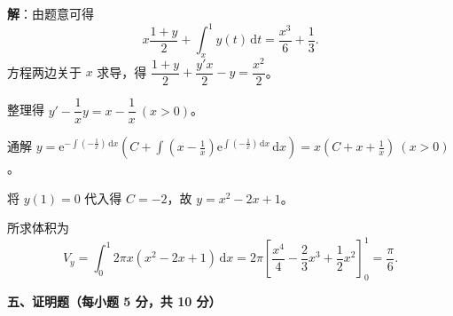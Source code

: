\documentclass[a4paper,11pt]{ctexart}
\newcommand{\dd}{\,\mathrm{d}}
\newcommand{\e}{\mathrm{e}}
\begin{document}
\begin{enumerate}[label=\arabic*., start=17, leftmargin=2em, itemsep=0.9em, topsep=0.45em]
  \textbf{解}：由题意可得
  \[
    x\frac{1+y}{2}+\int_x^1 y(t)\dd t=\frac{x^3}{6}+\frac{1}{3}.
  \]
  方程两边关于 $x$ 求导，得 $\dfrac{1+y}{2}+\dfrac{y'x}{2}-y=\dfrac{x^2}{2}$。

  整理得 $y'-\dfrac{1}{x}y=x-\dfrac{1}{x}\ (x>0)$。

  通解 $y=\e^{-\int\left(-\frac{1}{x}\right)\dd x}\left(C+\displaystyle\int\left(x-\frac{1}{x}\right)\e^{\int\left(-\frac{1}{x}\right)\dd x}\dd x\right)=x\left(C+x+\frac{1}{x}\right)\ (x>0)$。

  将 $y(1)=0$ 代入得 $C=-2$，故 $y=x^2-2x+1$。

  所求体积为
  \[
    V_y=\int_0^1 2\pi x(x^2-2x+1)\dd x = 2\pi\left[\frac{x^4}{4}-\frac{2}{3}x^3+\frac{1}{2}x^2\right]_0^1 = \frac{\pi}{6}.
  \]
\end{enumerate}

\vspace{0.6em}

\textbf{五、证明题（每小题 5 分，共 10 分）}
\end{document}
